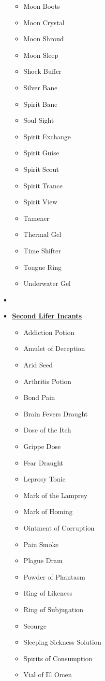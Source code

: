 \begin{multicols*}{4}
\begin{itemize}[leftmargin=0pt]
\begin{itemize}[leftmargin=0pt]
		\item[] Moon Boots
		\item[] Moon Crystal
		\item[] Moon Shroud
		\item[] Moon Sleep
		\item[] Shock Buffer
		\item[] Silver Bane
		\item[] Spirit Bane
		\item[] Soul Sight
		\item[] Spirit Exchange
		\item[] Spirit Guise
		\item[] Spirit Scout
		\item[] Spirit Trance
		\item[] Spirit View
		\item[] Tamener
		\item[] Thermal Gel
		\item[] Time Shifter
		\item[] Tongue Ring
		\item[] Underwater Gel
	\end{itemize}
	\item[] 
	\item[] \textbf{\ul{Second Lifer Incants}}
	\begin{itemize}[leftmargin=0pt]
		\item[] Addiction Potion
		\item[] Amulet of Deception
		\item[] Arid Seed
		\item[] Arthritis Potion
		\item[] Bond Pain
		\item[] Brain Fevers Draught
		\item[] Dose of the Itch
		\item[] Grippe Dose
		\item[] Fear Draught
		\item[] Leprosy Tonic
		\item[] Mark of the Lamprey
		\item[] Mark of Homing
		\item[] Ointment of Corruption
		\item[] Pain Smoke
		\item[] Plague Dram
		\item[] Powder of Phantasm
		\item[] Ring of Likeness
		\item[] Ring of Subjugation
		\item[] Scourge
		\item[] Sleeping Sickness Solution
		\item[] Spirits of Consumption
		\item[] Vial of Ill Omen 
	\end{itemize}
\end{itemize}
\end{multicols*}
\pagebreak
